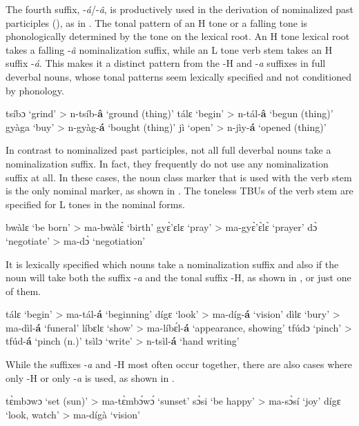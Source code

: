 The fourth suffix, -{\itshape á}/-{\itshape â}, is productively used in the derivation of nominalized past participles (), as in . The tonal pattern of an H tone or a falling tone is phonologically determined by the tone on the lexical root. An H tone lexical root takes a falling -{\itshape â} nominalization suffix, while an L tone verb stem takes an H suffix -{\itshape á}.  This makes it a distinct pattern from the -H and -{\itshape a} suffixes in full deverbal nouns, whose tonal patterns seem lexically specified and not conditioned by phonology. 

\ea  \label{nomp}
\ea  tsíbɔ `grind' >  n-tsíb-{\bfseries â} `ground (thing)'
\ex tálɛ `begin' >  n-tál-{\bfseries â} `begun (thing)'
\ex gyàga `buy' >  n-gyàg-{\bfseries á} `bought (thing)'
\ex jì `open' >  n-jìy-{\bfseries á} `opened (thing)'
\z
\z


In contrast to nominalized past participles, not all full deverbal nouns take a nominalization suffix. In fact, they frequently do not use any nominalization suffix at all. In these cases, the noun class marker that is used with the verb stem is the only nominal marker, as shown in . The toneless TBUs of the verb stem are specified for L tones in the nominal forms. 

\ea  \label{NOMb}
\ea  bwàlɛ `be born' > ma-bwàlɛ̀ `birth'
\ex gyɛ̀'ɛlɛ `pray' >  ma-gyɛ̀'ɛ̀lɛ̀ `prayer'
\ex dɔ̀ `negotiate' >  ma-dɔ̀ `negotiation'
\z
\z

It is lexically specified which nouns take a nominalization suffix and also if the noun will take both the suffix -{\itshape a} and the tonal suffix -H, as shown in , or just one of them. 

\ea  \label{NOMa}
\ea  tálɛ `begin' >  ma-tál-{\bfseries á} `beginning'
\ex dígɛ `look' >  ma-díg-{\bfseries á} `vision'
\ex dìlɛ `bury' >  ma-dìl-{\bfseries á} `funeral'
\ex líbɛlɛ `show' >  ma-líbɛ́l-{\bfseries á} `appearance, showing'
\ex tfúdɔ `pinch' >  tfúd-{\bfseries á} `pinch (n.)'
\ex tsìlɔ `write' >  n-tsìl-{\bfseries á} `hand writing'
\z
\z

While the suffixes -{\itshape a} and -H most often occur together, there are also cases where only -H or only -{\itshape a} is used, as shown in .

\ea  \label{NOMx}
\ea tɛ̀mbɔwɔ `set (sun)' >  ma-tɛ̀mbɔ́wɔ́ `sunset'
\ex sɔ̀si  `be happy' > ma-sɔ̀sí `joy'
\ex dígɛ `look, watch' >  ma-dígà `vision'
\z
\z

